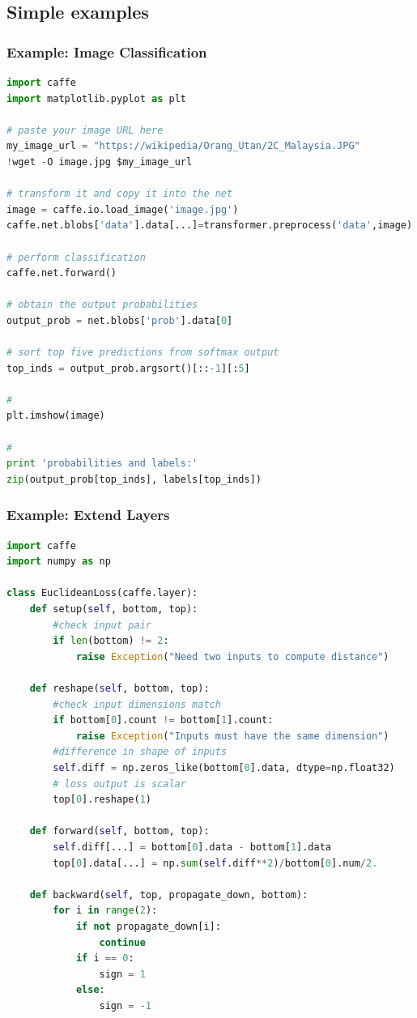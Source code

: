 \subsection{Simple examples}
\begin{frame}[fragile]
  \MyLogo
  \frametitle{Example: Image Classification}  

\begin{lstlisting}[language=python]
import caffe
import matplotlib.pyplot as plt

# paste your image URL here
my_image_url = "https://wikipedia/Orang_Utan/2C_Malaysia.JPG"
!wget -O image.jpg $my_image_url

# transform it and copy it into the net
image = caffe.io.load_image('image.jpg')
caffe.net.blobs['data'].data[...]=transformer.preprocess('data',image)

# perform classification
caffe.net.forward()

# obtain the output probabilities
output_prob = net.blobs['prob'].data[0]

# sort top five predictions from softmax output
top_inds = output_prob.argsort()[::-1][:5]

# 
plt.imshow(image)

#
print 'probabilities and labels:'
zip(output_prob[top_inds], labels[top_inds])
\end{lstlisting}

\vskip 50pt

\end{frame}


\begin{frame}[fragile]
  \MyLogo
  \frametitle{Example: Extend Layers}  
\begin{lstlisting}[language=python]
import caffe
import numpy as np 

class EuclideanLoss(caffe.layer):
	def setup(self, bottom, top):
		#check input pair
		if len(bottom) != 2:
			raise Exception("Need two inputs to compute distance")
			
	def reshape(self, bottom, top):
		#check input dimensions match
		if bottom[0].count != bottom[1].count:
			raise Exception("Inputs must have the same dimension")
		#difference in shape of inputs
		self.diff = np.zeros_like(bottom[0].data, dtype=np.float32)
		# loss output is scalar
		top[0].reshape(1)
		
	def forward(self, bottom, top):
		self.diff[...] = bottom[0].data - bottom[1].data
		top[0].data[...] = np.sum(self.diff**2)/bottom[0].num/2.	

	def backward(self, top, propagate_down, bottom):
		for i in range(2):
			if not propagate_down[i]:
				continue
			if i == 0:
				sign = 1
			else:
				sign = -1
\end{lstlisting}
\end{frame}

